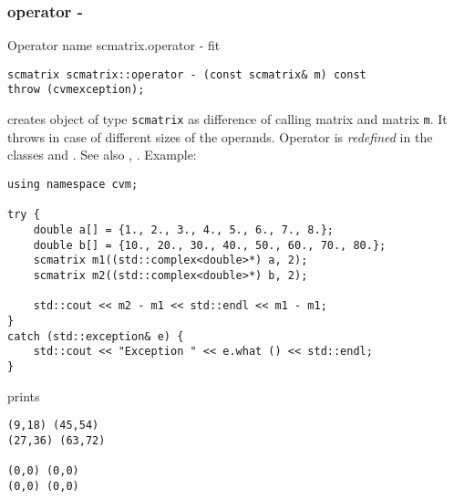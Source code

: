 \subsubsection{operator -}
Operator%
\pdfdest name {scmatrix.operator -} fit
\begin{verbatim}
scmatrix scmatrix::operator - (const scmatrix& m) const
throw (cvmexception);
\end{verbatim}
creates  object of type \verb"scmatrix" as  difference of
 calling matrix and  matrix \verb"m".
It throws  
in case of different sizes of the operands.
Operator is \emph{redefined} in the classes
and .
See also , .
Example:
\begin{Verbatim}
using namespace cvm;

try {
    double a[] = {1., 2., 3., 4., 5., 6., 7., 8.};
    double b[] = {10., 20., 30., 40., 50., 60., 70., 80.};
    scmatrix m1((std::complex<double>*) a, 2);
    scmatrix m2((std::complex<double>*) b, 2);

    std::cout << m2 - m1 << std::endl << m1 - m1;
}
catch (std::exception& e) {
    std::cout << "Exception " << e.what () << std::endl;
}
\end{Verbatim}
prints
\begin{Verbatim}
(9,18) (45,54)
(27,36) (63,72)

(0,0) (0,0)
(0,0) (0,0)
\end{Verbatim}
\newpage





